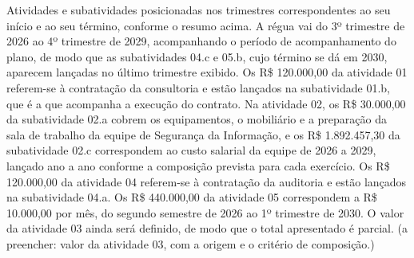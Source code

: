 \documentclass[12pt,a4paper]{article}
\begin{document}
Atividades e subatividades posicionadas nos trimestres correspondentes ao seu início e ao seu término, conforme o resumo acima. A régua vai do 3º trimestre de 2026 ao 4º trimestre de 2029, acompanhando o período de acompanhamento do plano, de modo que as subatividades 04.c e 05.b, cujo término se dá em 2030, aparecem lançadas no último trimestre exibido. Os R\$ 120.000,00 da atividade 01 referem-se à contratação da consultoria e estão lançados na subatividade 01.b, que é a que acompanha a execução do contrato. Na atividade 02, os R\$ 30.000,00 da subatividade 02.a cobrem os equipamentos, o mobiliário e a preparação da sala de trabalho da equipe de Segurança da Informação, e os R\$ 1.892.457,30 da subatividade 02.c correspondem ao custo salarial da equipe de 2026 a 2029, lançado ano a ano conforme a composição prevista para cada exercício. Os R\$ 120.000,00 da atividade 04 referem-se à contratação da auditoria e estão lançados na subatividade 04.a. Os R\$ 440.000,00 da atividade 05 correspondem a R\$ 10.000,00 por mês, do segundo semestre de 2026 ao 1º trimestre de 2030. O valor da atividade 03 ainda será definido, de modo que o total apresentado é parcial. (a preencher: valor da atividade 03, com a origem e o critério de composição.)
\end{document}
